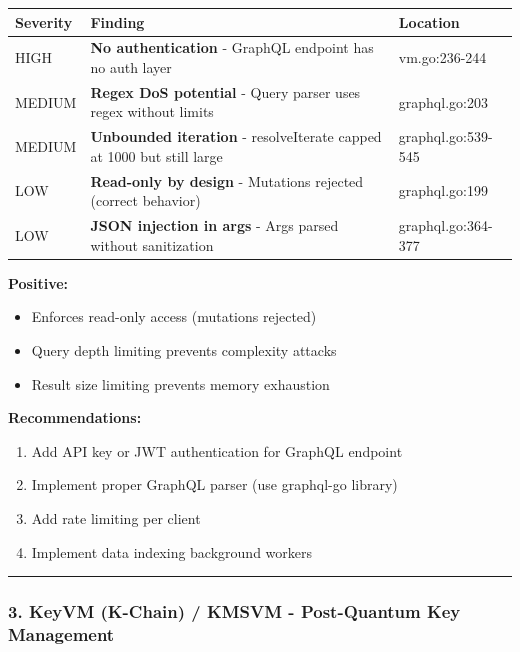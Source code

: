 \documentclass[
]{article}
\newcounter{none} %
\providecommand{\tightlist}{%
  \setlength{\itemsep}{0pt}\setlength{\parskip}{0pt}}
\begin{document}
{\def\LTcaptype{none} %
\begin{longtable}[]{@{}lll@{}}
\toprule\noalign{}
Severity & Finding & Location \\
\midrule\noalign{}
\endhead
\bottomrule\noalign{}
\endlastfoot
HIGH & \textbf{No authentication} - GraphQL endpoint has no auth layer &
vm.go:236-244 \\
MEDIUM & \textbf{Regex DoS potential} - Query parser uses regex without
limits & graphql.go:203 \\
MEDIUM & \textbf{Unbounded iteration} - resolveIterate capped at 1000
but still large & graphql.go:539-545 \\
LOW & \textbf{Read-only by design} - Mutations rejected (correct
behavior) & graphql.go:199 \\
LOW & \textbf{JSON injection in args} - Args parsed without sanitization
& graphql.go:364-377 \\
\end{longtable}
}

\textbf{Positive:}

\begin{itemize}
\tightlist
\item
  Enforces read-only access (mutations rejected)
\item
  Query depth limiting prevents complexity attacks
\item
  Result size limiting prevents memory exhaustion
\end{itemize}

\textbf{Recommendations:}

\begin{enumerate}
\def\labelenumi{\arabic{enumi}.}
\tightlist
\item
  Add API key or JWT authentication for GraphQL endpoint
\item
  Implement proper GraphQL parser (use graphql-go library)
\item
  Add rate limiting per client
\item
  Implement data indexing background workers
\end{enumerate}

\begin{center}\rule{0.5\linewidth}{0.5pt}\end{center}

\subsubsection{3. KeyVM (K-Chain) / KMSVM - Post-Quantum Key
Management}\label{3-keyvm-k-chain--kmsvm---post-quantum-key-management}
\end{document}
